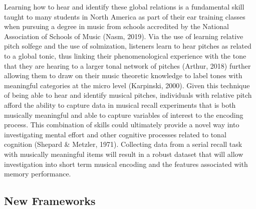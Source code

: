\documentclass[english,man]{apa6}
\begin{document}
Learning how to hear and identify these global relations is a fundamental skill taught to many students in North America as part of their ear training classes when pursuing a degree in music from schools accredited by the National Association of Schools of Music (Nasm, 2019).
Via the use of learning relative pitch solfege and the use of solmization, listeners learn to hear pitches as related to a global tonic, thus linking their phenomenological experience with the tone that they are hearing to a larger tonal network of pitches (Arthur, 2018) further allowing them to draw on their music theoretic knowledge to label tones with meaningful categories at the micro level (Karpinski, 2000).
Given this technique of being able to hear and identify musical pitches, individuals with relative pitch afford the ability to capture data in musical recall experiments that is both musically meaningful and able to capture variables of interest to the encoding process.
This combination of skills could ultimately provide a novel way into investigating mental effort and other cognitive processes related to tonal cognition (Shepard \& Metzler, 1971).
Collecting data from a serial recall task with musically meaningful items will result in a robust dataset that will allow investigation into short term musical encoding and the features associated with memory performance.

\hypertarget{new-frameworks}{%
\subsection{New Frameworks}\label{new-frameworks}}
\end{document}
